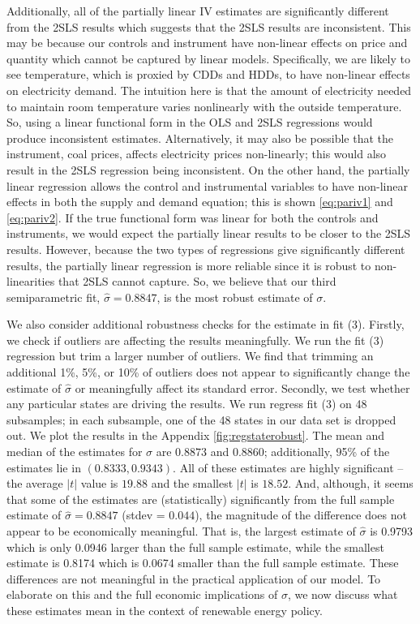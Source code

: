 \documentclass[11pt,a4paper,leqno]{extarticle}
\begin{document}
	Additionally, all of the partially linear IV estimates are significantly different from the 2SLS results which suggests that the 2SLS results are inconsistent. This may be because our controls and instrument have non-linear effects on price and quantity which cannot be captured by linear models. Specifically, we are likely to see  temperature, which is proxied by CDDs and HDDs, to have non-linear effects on electricity demand. The intuition here is that the amount of electricity needed to maintain room temperature varies nonlinearly with the outside temperature. So, using a linear functional form in the OLS and 2SLS regressions would produce inconsistent estimates.  Alternatively, it may also be possible that the instrument, coal prices, affects electricity prices  non-linearly; this would also result in the 2SLS regression being inconsistent.  On the other hand, the partially linear regression allows the control and instrumental  variables to have non-linear effects in both the supply and demand equation; this is shown \autoref{eq:pariv1} and \autoref{eq:pariv2}.  If the true functional form was linear for both the controls and instruments, we would expect the partially linear results to be closer to the 2SLS results. However, because the two types of regressions give significantly different results, the partially linear regression is more reliable since it is robust to non-linearities that 2SLS cannot capture. So, we believe that our third semiparametric fit, $\hat{\sigma} = 0.8847$, is the most robust estimate of $\sigma$. 
	
	
	We also consider additional robustness checks for the estimate in fit (3). Firstly, we check if outliers are affecting the results meaningfully. We run the fit (3) regression but trim a larger number of outliers. We find that trimming an additional 1\%, 5\%, or 10\% of outliers does not appear to significantly change the estimate of $\hat{\sigma}$ or meaningfully affect its standard error. Secondly, we test whether any particular states are driving the results. We run regress fit (3) on 48 subsamples; in each subsample, one of the 48 states in our data set is dropped out. We plot the results in the Appendix \autoref{fig:regstaterobust}. The mean and median of the estimates for $\sigma$ are  $0.8873$ and $0.8860$; additionally, 95\% of the estimates lie in $(0.8333, 0.9343)$. All of these estimates are highly significant -- the average $|t|$ value is $19.88$ and the smallest $|t|$ is $18.52$. And, although, it seems that some of the estimates are (statistically) significantly  from the full sample estimate of $\hat{\sigma} = 0.8847$ (stdev = $0.044$), the magnitude of the difference does not appear to be economically meaningful. That is, the largest estimate of $\hat{\sigma}$ is 0.9793 which is only 0.0946 larger than the full sample estimate, while the smallest estimate is 0.8174 which is 0.0674 smaller than the full sample estimate. These differences are not meaningful in the practical application of our model. To elaborate on this and the full economic implications of $\sigma$, we now discuss what these estimates mean in the context of renewable energy policy.
	
\end{document}
